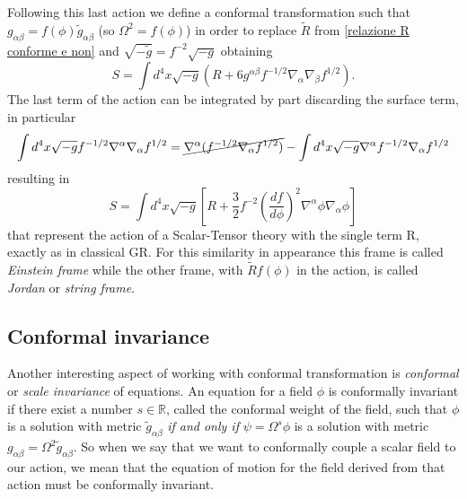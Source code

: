 Following this last action we define a conformal transformation such that $g_{\alpha \beta} = f(\phi) \tilde{g}_{\alpha \beta}$ (so $\Omega^2 = f(\phi)$) in order to replace $\tilde{R}$ from \ref{relazione R conforme e non} and $\sqrt{-\tilde{g}} = f^{-2}\sqrt{-g}$ obtaining
\begin{equation}
    S = \int d^4x \sqrt{-g}(R + 6g^{\alpha \beta} f^{-1/2}\nabla_{\alpha}\nabla_{\beta}f^{1/2}).
\end{equation}
The last term of the action can be integrated by part discarding the surface term, in particular 
\begin{equation}
    \int d^4x \sqrt{-g}f^{-1/2}\nabla^{\alpha}\nabla_{\alpha}f^{1/2}=\cancel{\nabla^{\alpha}(f^{-1/2}\nabla_{\alpha}f^{1/2})}-\int d^4x \sqrt{-g}\nabla^{\alpha}f^{-1/2}\nabla_{\alpha}f^{1/2}
\end{equation}
resulting in
\begin{equation}
    S=\int d^4x \sqrt{-g}\left[R + \frac{3}{2}f^{-2}\left(\frac{df}{d\phi}\right)^2\nabla^{\alpha}\phi \nabla_{\alpha}\phi\right]
\end{equation}
that represent the action of a Scalar-Tensor theory with the single term R, exactly  as in classical GR. For this similarity in appearance this frame is called \emph{Einstein frame} while the other frame, with $\tilde{R}f(\phi)$ in the action, is called \emph{Jordan} or \emph{string frame}.


\subsection{Conformal invariance}
Another interesting aspect of working with conformal transformation is \emph{conformal} or \emph{ scale invariance} of equations. An equation for a field $\phi$ is conformally invariant if there exist a number $s\in \mathbb{R}$, called the conformal weight of the field, such that $\phi$ is a solution with metric $\tilde{g}_{\alpha \beta}$ \emph{if and only if} $\psi = \Omega^s \phi$ is a solution with metric $g_{\alpha \beta} = \Omega^2\tilde{g}_{\alpha \beta}$. So when we say that we want to conformally couple a scalar field to our action, we mean that the equation of motion for the field derived from that action must be conformally invariant.

